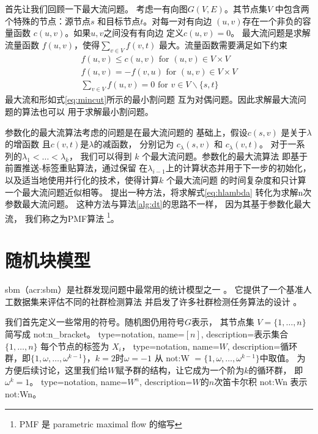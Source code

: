 首先让我们回顾一下最大流问题。
考虑一有向图$G(V,E)$。其节点集$V$
中包含两个特殊的节点：源节点$s$
和目标节点$t$。对每一对有向边
$(u,v)$存在一个非负的容量函数
$c(u,v)$。如果$u,v$之间没有有向边
定义$c(u,v)=0$。
最大流问题是求解流量函数
$f(u,v)$，使得$\sum_{v\in V} f(v,t)$
最大。流量函数需要满足如下约束
\begin{align}
  f(u, v) \leq c(u, v) \textrm{ for } (u, v) \in V \times V \\
  f(u, v) = -f(v, u) \textrm{ for } (u, v) \in V \times V \\
  \sum_{v \in V} f(u,v) = 0 \textrm{ for } v\in V\backslash\{s, t\}
\end{align}
最大流和形如式\eqref{eq:mincut}所示的最小割问题
互为对偶问题。因此求解最大流问题的算法也可以
用于求解最小割问题。

参数化的最大流算法考虑的问题是在最大流问题的
基础上，假设$c(s,v)$ 
是关于$\lambda$的增函数
且$c(v, t)$是$\lambda$的减函数，
分别记为
$c_{\lambda}(s,v)$ 和 $c_{\lambda}(v, t)$。
对于一系列的$\lambda_1 < \dots < \lambda_k$，
我们可以得到 $k$ 个最大流问题。参数化的最大流算法
即基于前置推送-标签重贴算法，通过保留
在$\lambda_{i-1}$上的计算状态并用于下一步的初始化，
以及适当地使用并行化的技术，使得计算$k$ 个最大流问题
的时间复杂度和只计算一个最大流问题近似相等。
\citet{kolmogorov} 提出一种方法，将求解式\ref{eq:hlambda}
转化为求解n次参数最大流问题。
这种方法与算法\ref{alg:dt}的思路不一样，
因为其基于参数化最大流，
我们称之为PMF算法
\footnote{PMF 是 parametric maximal flow 的缩写}。

\section{随机块模型}\label{sec:sbm}
\gls{sbm}（\gls{acr:sbm}）是社群发现问题中最常用的统计模型之一
\cite{holland1983stochastic, abbe2017community}。
它提供了一个基准人工数据集来评估不同的社群检测算法
并启发了许多社群检测任务算法的设计 \cite{fortunato2010community}。

我们首先定义一些常用的符号。随机图仍用符号$G$表示，
其节点集 $V=\{1,\dots, n\}$ 简写成 \gls{not:n_bracket}。
{
  type=notation,
  name={\ensuremath{[n]}},
  description={表示集合$\{1,\dots, n\}$}
}
每个节点的标签为 $X_i$，
{
  type=notation,
  name={\ensuremath{W}},
  description={循环群，即$\{1, \omega, \dots, \omega^{k-1}\}$，$k=2$时$\omega=-1$}
}
从 \gls{not:W} $= \{1, \omega, \dots, \omega^{k-1}\}$中取值。
为方便后续讨论，这里我们给$W$赋予群的结构，让它成为一个阶为$k$的循环群，
即$\omega^k=1$。
{
  type=notation,
  name={\ensuremath{W^n}},
  description={$W$的$n$次笛卡尔积}
}
\gls{not:Wn} 表示 \glsdesc{not:Wn}。 

